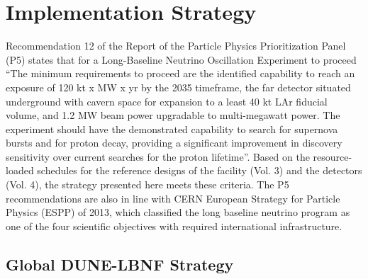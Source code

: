 \chapter{Implementation Strategy}
\label{ch:detectors-strategy}

Recommendation 12 of the Report of the Particle Physics Prioritization Panel (P5) 
states that for a Long-Baseline Neutrino Oscillation Experiment to proceed ``The 
minimum requirements to proceed are the identified capability to reach an exposure 
of 120 kt x MW x yr by the 2035 timeframe, the far detector situated underground 
with cavern space for expansion to a least 40 kt LAr fiducial volume, and 1.2 MW 
beam power upgradable to multi-megawatt power. The experiment should have the demonstrated 
capability to search for supernova bursts and for proton decay, providing a significant 
improvement in discovery sensitivity over current searches for the proton lifetime''. 
Based on the resource-loaded schedules for the reference designs of the facility 
(Vol. 3) and the detectors (Vol. 4), the strategy presented here meets these criteria. 
The P5 recommendations are also in line with CERN European Strategy for Particle 
Physics (ESPP) of 2013, which classified the long baseline neutrino program as 
one of the four scientific objectives with required international infrastructure.

\section{Global DUNE-LBNF Strategy}

